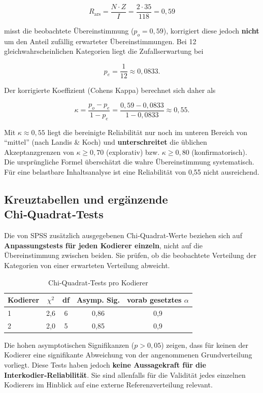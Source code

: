 \documentclass[
]{article}
\begin{document}
\[
R_{\text{ars}} = \frac{N \cdot Z}{I} = \frac{2 \cdot 35}{118} = 0{,}59
\]

misst die beobachtete Übereinstimmung (\(p_o = 0{,}59\)), korrigiert diese jedoch \textbf{nicht} um den Anteil zufällig erwarteter Übereinstimmungen. Bei 12 gleichwahrscheinlichen Kategorien liegt die Zufallserwartung bei

\[
p_e = \frac{1}{12} \approx 0{,}0833.
\]

Der korrigierte Koeffizient (Cohens Kappa) berechnet sich daher als

\[
\kappa = \frac{p_o - p_e}{1 - p_e} = \frac{0{,}59 - 0{,}0833}{1 - 0{,}0833} \approx 0{,}55.
\]

Mit \(\kappa \approx 0{,}55\) liegt die bereinigte Reliabilität nur noch im unteren Bereich von \enquote{mittel} (nach Landis \& Koch) und \textbf{unterschreitet} die üblichen Akzeptanzgrenzen von \(\kappa \ge 0{,}70\) (explorativ) bzw. \(\kappa \ge 0{,}80\) (konfirmatorisch). Die ursprüngliche Formel überschätzt die wahre Übereinstimmung systematisch. Für eine belastbare Inhaltsanalyse ist eine Reliabilität von 0,55 nicht ausreichend.

\subsection{Kreuztabellen und ergänzende Chi‑Quadrat‑Tests}\label{kreuztabellen-und-ergaenzende-chi-quadrattests}

Die von SPSS zusätzlich ausgegebenen Chi‑Quadrat‑Werte beziehen sich auf \textbf{Anpassungstests für jeden Kodierer einzeln}, nicht auf die Übereinstimmung zwischen beiden. Sie prüfen, ob die beobachtete Verteilung der Kategorien von einer erwarteten Verteilung abweicht.

\begin{table}[h]
\centering
\caption{Chi‑Quadrat‑Tests pro Kodierer}
\label{tab:chiquadrat}
\begin{tabular}{@{} l c c c c @{}}
\toprule
Kodierer & \(\chi^2\) & df & Asymp. Sig. & vorab gesetztes \(\alpha\) \\
\midrule
1 & 2,6 & 6 & 0,86 & 0,9 \\
2 & 2,0 & 5 & 0,85 & 0,9 \\
\bottomrule
\end{tabular}
\end{table}

Die hohen asymptotischen Signifikanzen (\(p > 0{,}05\)) zeigen, dass für keinen der Kodierer eine signifikante Abweichung von der angenommenen Grundverteilung vorliegt. Diese Tests haben jedoch \textbf{keine Aussagekraft für die Interkodier‑Reliabilität}. Sie sind allenfalls für die Validität jedes einzelnen Kodierers im Hinblick auf eine externe Referenzverteilung relevant.
\end{document}

